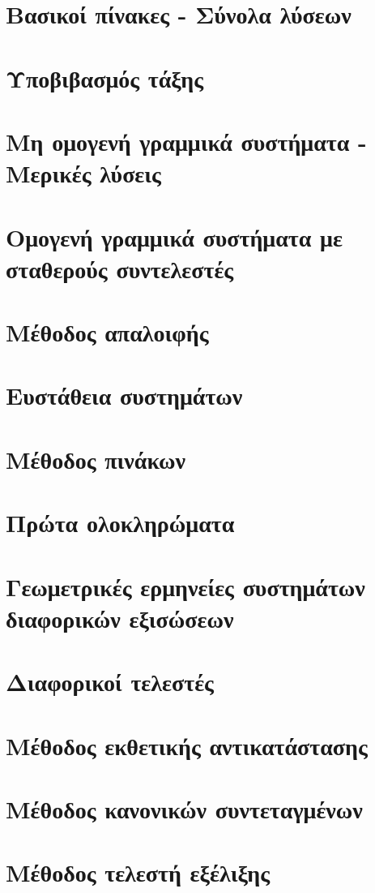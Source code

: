 \documentclass[11pt,a4paper,twoside]{book}
\begin{document}
\section{Βασικοί πίνακες - Σύνολα λύσεων}
\section{Υποβιβασμός τάξης}
\section{Μη ομογενή γραμμικά συστήματα - Μερικές λύσεις}
\section{Ομογενή γραμμικά συστήματα με σταθερούς συντελεστές}
\section{Μέθοδος απαλοιφής}
\section{Ευστάθεια συστημάτων}
\section{Μέθοδος πινάκων}
\section{Πρώτα ολοκληρώματα}
\section{Γεωμετρικές ερμηνείες συστημάτων διαφορικών εξισώσεων}
\section{Διαφορικοί τελεστές}
\section{Μέθοδος εκθετικής αντικατάστασης}
\section{Μέθοδος κανονικών συντεταγμένων}
\section{Μέθοδος τελεστή εξέλιξης}
\end{document}

